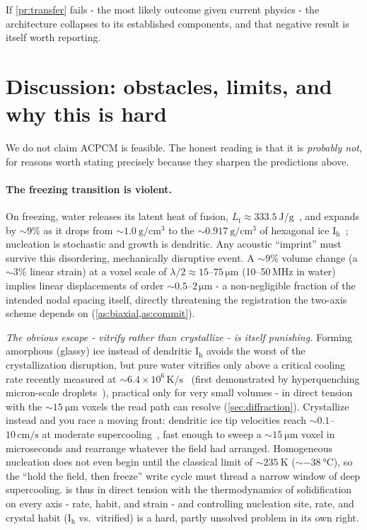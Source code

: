 \documentclass[11pt]{article}
\theoremstyle{definition}
\begin{document}
If \cref{pr:transfer} fails - the most likely outcome given current physics - the
architecture collapses to its established components, and that negative result is itself
worth reporting.

\section{Discussion: obstacles, limits, and why this is hard}
\label{sec:limits}

We do not claim ACPCM is feasible. The honest reading is that it is \emph{probably not},
for reasons worth stating precisely because they sharpen the predictions above.

\paragraph{The freezing transition is violent.}
On freezing, water releases its latent heat of fusion, $L_{\mathrm{f}}\approx\qty{333.5}{\joule\per\gram}$~\cite{osborne1939fusion},
and expands by ${\sim}9\%$ as it drops from ${\sim}\qty{1.0}{\gram\per\centi\meter\cubed}$ to
the ${\sim}\qty{0.917}{\gram\per\centi\meter\cubed}$ of hexagonal ice
$\mathrm{I_h}$~\cite{iapws95}; nucleation is stochastic and growth is dendritic. Any acoustic
``imprint'' must survive this disordering, mechanically disruptive event. A ${\sim}9\%$
volume change (a ${\sim}3\%$ linear strain) at a voxel scale of
$\lambda/2 \approx 15$--$75\,\unit{\micro\meter}$ (10--50\,MHz in water) implies linear
displacements of order ${\sim}0.5$--$2\,\unit{\micro\meter}$ - a non-negligible fraction of
the intended nodal spacing itself, directly threatening the registration the two-axis scheme
depends on (\cref{as:biaxial,as:commit}).

\emph{The obvious escape - vitrify rather than crystallize - is itself punishing.} Forming
amorphous (glassy) ice instead of dendritic $\mathrm{I_h}$ avoids the worst of the
crystallization disruption, but pure water vitrifies only above a critical cooling rate
recently measured at ${\sim}6.4\times10^{6}\,\unit{\kelvin\per\second}$~\cite{schmidt2025cooling}
(first demonstrated by hyperquenching micron-scale droplets~\cite{bruggeller1980vitrification}),
practical only for very small volumes - in direct tension with the ${\sim}\qty{15}{\micro\meter}$
voxels the read path can resolve (\cref{sec:diffraction}). Crystallize instead and you race a
moving front: dendritic ice tip velocities reach ${\sim}0.1$--$10\,\unit{\centi\meter\per\second}$
at moderate supercooling~\cite{shibkov2003ice,xu2016ice}, fast enough to sweep a
${\sim}\qty{15}{\micro\meter}$ voxel in microseconds and rearrange whatever the field had
arranged. Homogeneous nucleation does not even begin until the classical limit of
${\sim}\qty{235}{\kelvin}$ (${\sim}\qty{-38}{\celsius}$), so the ``hold the field, then
freeze'' write cycle must thread a narrow window of deep supercooling.  is thus in
direct tension with the thermodynamics of solidification on every axis - rate, habit, and
strain - and controlling nucleation site, rate, and crystal habit ($\mathrm{I_h}$ vs.\
vitrified) is a hard, partly unsolved problem in its own right.
\end{document}
